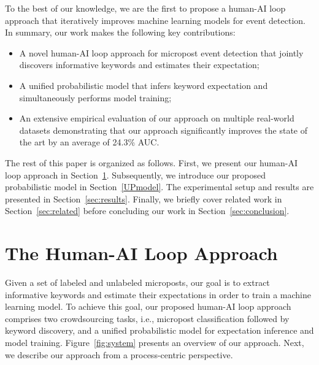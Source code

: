 \documentclass[letterpaper]{article}
\begin{document}
To the best of our knowledge, we are the first to propose a human-AI loop approach that iteratively improves machine learning models for event detection. In summary, our work makes the following key contributions:
\begin{itemize}
    \item A novel human-AI loop approach for micropost event detection %
    that jointly discovers informative keywords and estimates their expectation;
    \item A unified probabilistic model that infers keyword expectation and simultaneously performs model training;
    \item An extensive empirical evaluation of our approach on multiple real-world datasets demonstrating that our approach significantly improves the state of the art by an average of 24.3\% AUC.
\end{itemize}

The rest of this paper is organized as follows. First, we present our human-AI loop approach in Section~\ref{sec:model}. Subsequently, we introduce our proposed probabilistic model in Section~\ref{UPmodel}. The experimental setup and results are presented in Section~\ref{sec:results}. Finally, we briefly cover related work in Section~\ref{sec:related} before concluding our work in Section~\ref{sec:conclusion}.

\section{The Human-AI Loop Approach}
\label{sec:model}
Given a set of labeled and unlabeled microposts, our goal is to extract informative keywords and estimate their expectations in order to train a machine learning model. To achieve this goal, our proposed human-AI loop approach comprises two crowdsourcing tasks, i.e., micropost classification followed by keyword discovery, and a unified probabilistic model for expectation inference and model training. Figure~\ref{fig:system} presents an overview of our approach. Next, we describe our approach from a process-centric perspective.
\end{document}
